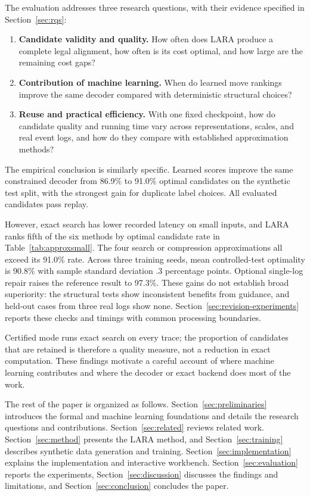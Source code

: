 The evaluation addresses three research questions, with their evidence specified in Section~\ref{sec:rqs}:
\begin{enumerate}[label=\textbf{RQ\arabic*.},leftmargin=*]
\item \textbf{Candidate validity and quality.} How often does LARA produce a complete legal alignment, how often is its cost optimal, and how large are the remaining cost gaps?
\item \textbf{Contribution of machine learning.} When do learned move rankings improve the same decoder compared with deterministic structural choices?
\item \textbf{Reuse and practical efficiency.} With one fixed checkpoint, how do candidate quality and running time vary across representations, scales, and real event logs, and how do they compare with established approximation methods?
\end{enumerate}

The empirical conclusion is similarly specific. Learned scores improve the same constrained decoder from 86.9\% to 91.0\% optimal candidates on the synthetic test split, with the strongest gain for duplicate label choices. All evaluated candidates pass replay. \begin{revised}However, exact search has lower recorded latency on small inputs, and LARA ranks fifth of the six methods by optimal candidate rate in Table~\ref{tab:approxsmall}. The four search or compression approximations all exceed its 91.0\% rate. Across three training seeds, mean controlled-test optimality is 90.8\% with sample standard deviation .3 percentage points. Optional single-log repair raises the reference result to 97.3\%. These gains do not establish broad superiority: the structural tests show inconsistent benefits from guidance, and held-out cases from three real logs show none. Section~\ref{sec:revision-experiments} reports these checks and timings with common processing boundaries.\end{revised} Certified mode runs exact search on every trace; the proportion of candidates that are retained is therefore a quality measure, not a reduction in exact computation. These findings motivate a careful account of where machine learning contributes and where the decoder or exact backend does most of the work.

The rest of the paper is organized as follows. Section~\ref{sec:preliminaries} introduces the formal and machine learning foundations and details the research questions and contributions. Section~\ref{sec:related} reviews related work. Section~\ref{sec:method} presents the LARA method, and Section~\ref{sec:training} describes synthetic data generation and training. Section~\ref{sec:implementation} explains the implementation and interactive workbench. Section~\ref{sec:evaluation} reports the experiments, Section~\ref{sec:discussion} discusses the findings and limitations, and Section~\ref{sec:conclusion} concludes the paper.
